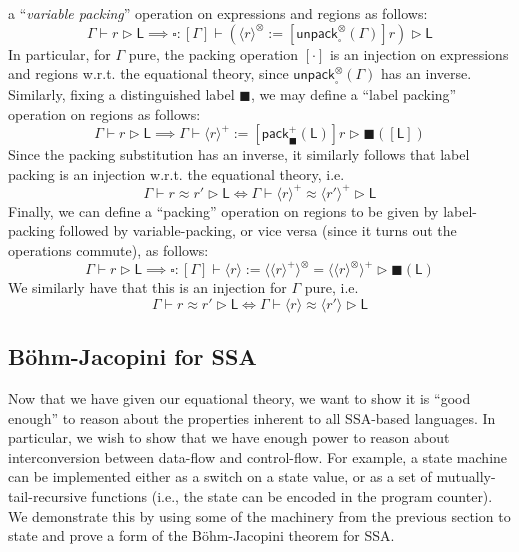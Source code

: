 \documentclass[acmsmall,screen,review]{acmart}
\newcommand{\ms}[1]{\ensuremath{\mathsf{#1}}}
\newcommand{\haslb}[3]{#1 \vdash #2 \rhd #3}
\newcommand{\teqv}{\approx}
\newcommand{\lbeq}[4]{#1 \vdash #2 \teqv #3 \rhd {#4}}
\newcommand{\invar}{\square}
\newcommand{\outlb}{\blacksquare}
\newcommand{\pckd}[1]{\langle #1 \rangle}
\begin{document}
a ``\emph{variable packing}'' operation on expressions and regions as follows:
\begin{equation}
  \haslb{\Gamma}{r}{\ms{L}} \implies 
  \haslb{\invar : [\Gamma]}{(\pckd{r}^\otimes := [\ms{unpack}_{\invar}^\otimes(\Gamma)]r)}{\ms{L}}
\end{equation}
In particular, for $\Gamma$ pure, the packing operation $[\cdot]$ is an injection on expressions and
regions w.r.t. the equational theory, since $\ms{unpack}_{\invar}^\otimes(\Gamma)$ has an inverse.
Similarly, fixing a distinguished label $\outlb$, we may define a ``label packing'' operation on
regions as follows:
\begin{equation}
  \haslb{\Gamma}{r}{\ms{L}} \implies 
  \haslb{\Gamma}{\pckd{r}^+ := [\ms{pack}_{\outlb}^+(\ms{L})]r}{\outlb([\ms{L}])}
\end{equation}
Since the packing substitution has an inverse, it similarly follows that label packing is an
injection w.r.t. the equational theory, i.e.
\begin{equation}
  \lbeq{\Gamma}{r}{r'}{\ms{L}} \iff \lbeq{\Gamma}{\pckd{r}^+}{\pckd{r'}^+}{\ms{L}}
\end{equation}
Finally, we can define a ``packing'' operation on regions to be given by label-packing followed by
variable-packing, or vice versa (since it turns out the operations commute), as follows:
\begin{equation}
  \haslb{\Gamma}{r}{\ms{L}} \implies 
  \haslb{\invar : [\Gamma]}
    {\pckd{r} := \pckd{\pckd{r}^+}^\otimes = \pckd{\pckd{r}^\otimes}^+}
    {\outlb(\ms{L})}
\end{equation}
We similarly have that this is an injection for $\Gamma$ pure, i.e.
\begin{equation}
  \lbeq{\Gamma}{r}{r'}{\ms{L}} \iff \lbeq{\Gamma}{\pckd{r}}{\pckd{r'}}{\ms{L}}
\end{equation}


\subsection{B\"ohm-Jacopini for SSA}

\label{apx:data-control}

Now that we have given our equational theory, we want to show it is ``good enough'' to reason about
the properties inherent to all SSA-based languages. In particular, we wish to show that we have
enough power to reason about interconversion between data-flow and control-flow. For example, a
state machine can be implemented either as a switch on a state value, or as a set of
mutually-tail-recursive functions (i.e., the state can be encoded in the program counter). We
demonstrate this by using some of the machinery from the previous section to state and prove a form
of the B\"ohm-Jacopini theorem \cite{bohm-jacopini} for SSA.
\end{document}
